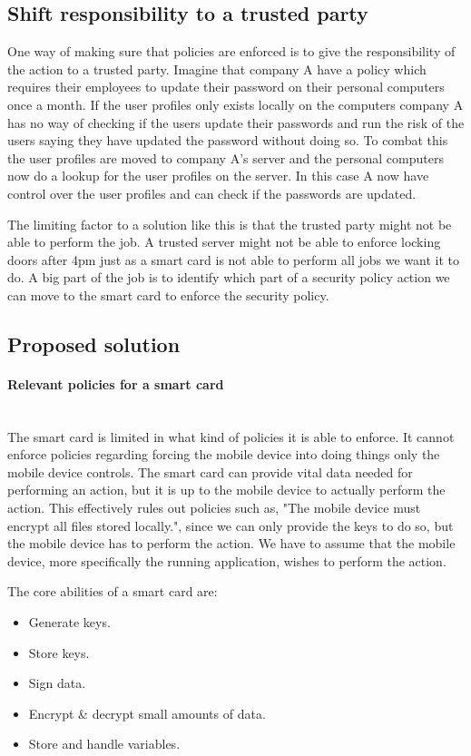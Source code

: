 \subsection{Shift responsibility to a trusted party}
One way of making sure that policies are enforced is to give the responsibility of the action to a trusted party. Imagine that company A have a policy which requires their employees to update their password on their personal computers once a month. If the user profiles only exists locally on the computers company A has no way of checking if the users update their passwords and run the risk of the users saying they have updated the password without doing so. To combat this the user profiles are moved to company A's server and the personal computers now do a lookup for the user profiles on the server. In this case A now have control over the user profiles and can check if the passwords are updated.

The limiting factor to a solution like this is that the trusted party might not be able to perform the job. A trusted server might not be able to enforce locking doors after 4pm just as a smart card is not able to perform all jobs we want it to do. A big part of the job is to identify which part of a security policy action we can move to the smart card to enforce the security policy.

\subsection{Proposed solution}
\label{sec:policySolution}

\paragraph{Relevant policies for a smart card}\mbox{}\\
The smart card is limited in what kind of policies it is able to enforce. It cannot enforce policies regarding forcing the mobile device into doing things only the mobile device controls. The smart card can provide vital data needed for performing an action, but it is up to the mobile device to actually perform the action. This effectively rules out policies such as, "The mobile device must encrypt all files stored locally.", since we can only provide the keys to do so, but the mobile device has to perform the action. We have to assume that the mobile device, more specifically the running application, wishes to perform the action.

The core abilities of a smart card are:
\begin{itemize}
    \item Generate keys.
    \item Store keys.
    \item Sign data.
    \item Encrypt \& decrypt small amounts of data.
    \item Store and handle variables.
\end{itemize}

